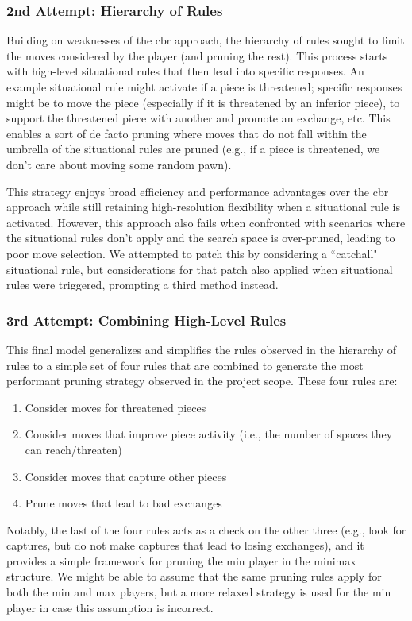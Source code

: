 \documentclass[letterpaper]{article}
\begin{document}
\subsubsection{2nd Attempt: Hierarchy of Rules}
Building on weaknesses of the \acrshort{cbr} approach, the hierarchy of rules sought to limit the moves considered by the player (and pruning the rest).  This process starts with high-level situational rules that then lead into specific responses.  An example situational rule might activate if a piece is threatened; specific responses might be to move the piece (especially if it is threatened by an inferior piece), to support the threatened piece with another and promote an exchange, etc.  This enables a sort of de facto pruning where moves that do not fall within the umbrella of the situational rules are pruned (e.g., if a piece is threatened, we don't care about moving some random pawn).

This strategy enjoys broad efficiency and performance advantages over the \acrshort{cbr} approach while still retaining high-resolution flexibility when a situational rule is activated.  However, this approach also fails when confronted with scenarios where the situational rules don't apply and the search space is over-pruned, leading to poor move selection.  We attempted to patch this by considering a ``catchall" situational rule, but considerations for that patch also applied when situational rules were triggered, prompting a third method instead.

\subsubsection{3rd Attempt: Combining High-Level Rules}
This final model generalizes and simplifies the rules observed in the hierarchy of rules to a simple set of four rules that are combined to generate the most performant pruning strategy observed in the project scope.  These four rules are:
\begin{enumerate}
    \item Consider moves for threatened pieces
    \item Consider moves that improve piece activity (i.e., the number of spaces they can reach/threaten)
    \item Consider moves that capture other pieces
    \item Prune moves that lead to bad exchanges
\end{enumerate}
Notably, the last of the four rules acts as a check on the other three (e.g., look for captures, but do not make captures that lead to losing exchanges), and it provides a simple framework for pruning the min player in the minimax structure.  We might be able to assume that the same pruning rules apply for both the min and max players, but a more relaxed strategy is used for the min player in case this assumption is incorrect.
\end{document}
